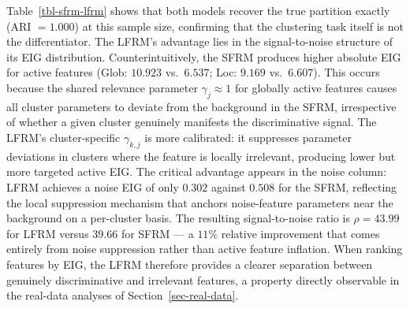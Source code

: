 \documentclass[
  letterpaper,
  DIV=11,
  numbers=noendperiod]{scrartcl}
\begin{document}
\begin{table}

\caption{\label{tbl-sfrm-lfrm}Mean EIG by feature class and partition
accuracy for SFRM vs.~LFRM (\(n = 240\), \(K_0 = 3\),
\(J_{\text{act}} = 16\), model type 2, 20 replications). Bold: best
value per column (\(\rho\) and noise EIG favour LFRM; absolute active
EIG favours SFRM).}


\end{table}%

Table~\ref{tbl-sfrm-lfrm} shows that both models recover the true
partition exactly (ARI \(= 1.000\)) at this sample size, confirming that
the clustering task itself is not the differentiator. The LFRM's
advantage lies in the signal-to-noise structure of its EIG distribution.
Counterintuitively, the SFRM produces higher absolute EIG for active
features (Glob: \(10.923\) vs.~\(6.537\); Loc: \(9.169\) vs.~\(6.607\)).
This occurs because the shared relevance parameter
\(\gamma_j \approx 1\) for globally active features causes all cluster
parameters to deviate from the background in the SFRM, irrespective of
whether a given cluster genuinely manifests the discriminative signal.
The LFRM's cluster-specific \(\gamma_{k,j}\) is more calibrated: it
suppresses parameter deviations in clusters where the feature is locally
irrelevant, producing lower but more targeted active EIG. The critical
advantage appears in the noise column: LFRM achieves a noise EIG of only
\(0.302\) against \(0.508\) for the SFRM, reflecting the local
suppression mechanism that anchors noise-feature parameters near the
background on a per-cluster basis. The resulting signal-to-noise ratio
is \(\rho = 43.99\) for LFRM versus \(39.66\) for SFRM --- a \(11\%\)
relative improvement that comes entirely from noise suppression rather
than active feature inflation. When ranking features by EIG, the LFRM
therefore provides a clearer separation between genuinely discriminative
and irrelevant features, a property directly observable in the real-data
analyses of Section~\ref{sec-real-data}.
\end{document}
